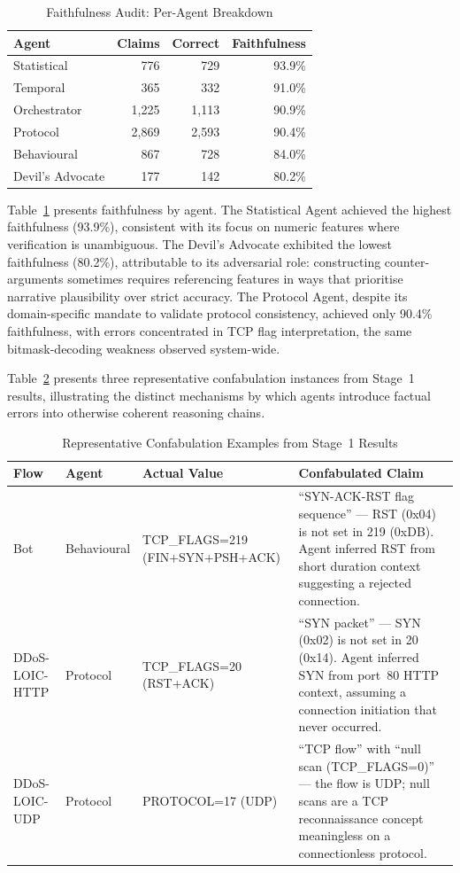 \documentclass[../main.tex]{subfiles}
\begin{document}
\begin{table}[H]
\centering
\caption{Faithfulness Audit: Per-Agent Breakdown}
\label{tab:faithfulness-agents}
\small
\begin{tabular}{l r r r}
\toprule
Agent & Claims & Correct & Faithfulness \\
\midrule
Statistical & 776 & 729 & 93.9\% \\
Temporal & 365 & 332 & 91.0\% \\
Orchestrator & 1{,}225 & 1{,}113 & 90.9\% \\
Protocol & 2{,}869 & 2{,}593 & 90.4\% \\
Behavioural & 867 & 728 & 84.0\% \\
Devil's Advocate & 177 & 142 & 80.2\% \\
\bottomrule
\end{tabular}
\end{table}

Table~\ref{tab:faithfulness-agents} presents faithfulness by agent. The Statistical Agent achieved the highest faithfulness (93.9\%), consistent with its focus on numeric features where verification is unambiguous. The Devil's Advocate exhibited the lowest faithfulness (80.2\%), attributable to its adversarial role: constructing counter-arguments sometimes requires referencing features in ways that prioritise narrative plausibility over strict accuracy. The Protocol Agent, despite its domain-specific mandate to validate protocol consistency, achieved only 90.4\% faithfulness, with errors concentrated in TCP flag interpretation, the same bitmask-decoding weakness observed system-wide.

Table~\ref{tab:confab-examples} presents three representative confabulation instances from Stage~1 results, illustrating the distinct mechanisms by which agents introduce factual errors into otherwise coherent reasoning chains.

\begin{table}[H]
\centering
\caption{Representative Confabulation Examples from Stage~1 Results}
\label{tab:confab-examples}
\small
\begin{tabularx}{\textwidth}{@{}l l l X@{}}
\toprule
\textbf{Flow} & \textbf{Agent} & \textbf{Actual Value} & \textbf{Confabulated Claim} \\
\midrule
Bot & Behavioural & TCP\_FLAGS=219 (FIN+SYN+PSH+ACK) & ``SYN-ACK-RST flag sequence'' --- RST (0x04) is not set in 219 (0xDB). Agent inferred RST from short duration context suggesting a rejected connection. \\
\addlinespace[4pt]
DDoS-LOIC-HTTP & Protocol & TCP\_FLAGS=20 (RST+ACK) & ``SYN packet'' --- SYN (0x02) is not set in 20 (0x14). Agent inferred SYN from port~80 HTTP context, assuming a connection initiation that never occurred. \\
\addlinespace[4pt]
DDoS-LOIC-UDP & Protocol & PROTOCOL=17 (UDP) & ``TCP flow'' with ``null scan (TCP\_FLAGS=0)'' --- the flow is UDP; null scans are a TCP reconnaissance concept meaningless on a connectionless protocol. \\
\bottomrule
\end{tabularx}
\end{table}
\end{document}
